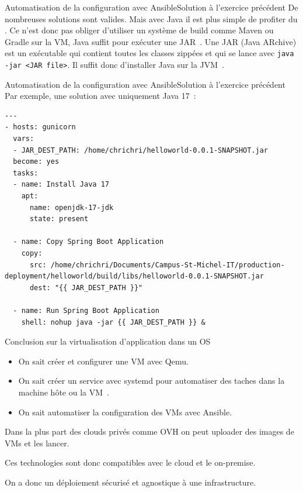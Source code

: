 \documentclass{beamer}
\begin{document}
    \begin{frame}{Automatisation de la configuration avec Ansible}{Solution à l'exercice précédent}
        De nombreuses solutions sont valides.
        Mais avec Java il est plus simple de profiter du .
        \bigbreak
        Ce n'est donc pas obliger d'utiliser un système de build comme Maven ou Gradle sur la VM, Java suffit pour exécuter une JAR~.
        \bigbreak
        Une JAR (Java ARchive) est un exécutable qui contient toutes les classes zippées et qui se lance avec \lstinline{java -jar <JAR file>}.
        Il suffit donc d'installer Java sur la JVM~.
    \end{frame}

    \begin{frame}[fragile]{Automatisation de la configuration avec Ansible}{Solution à l'exercice précédent}
        Par exemple, une solution avec uniquement Java 17~:
        \begin{lstlisting}[basicstyle=\ttfamily\tiny]
---
- hosts: gunicorn
  vars:
  - JAR_DEST_PATH: /home/chrichri/helloworld-0.0.1-SNAPSHOT.jar
  become: yes
  tasks:
  - name: Install Java 17
    apt:
      name: openjdk-17-jdk
      state: present

  - name: Copy Spring Boot Application
    copy:
      src: /home/chrichri/Documents/Campus-St-Michel-IT/production-deployment/helloworld/build/libs/helloworld-0.0.1-SNAPSHOT.jar
      dest: "{{ JAR_DEST_PATH }}"

  - name: Run Spring Boot Application
    shell: nohup java -jar {{ JAR_DEST_PATH }} &
        \end{lstlisting}
    \end{frame}


    \begin{frame}{Conclusion sur la virtualisation d'application dans un OS}
        \begin{itemize}
            \item On sait créer et configurer une VM avec Qemu.
            \item On sait créer un service avec systemd pour automatiser des taches dans la machine hôte ou la VM~.
            \item On sait automatiser la configuration des VMs avec Ansible.
        \end{itemize}
        \bigbreak
        Dans la plus part des clouds privés comme OVH on peut uploader des images de VMs et les lancer.

        Ces technologies sont donc compatibles avec le cloud et le on-premise.

        On a donc un déploiement sécurisé et agnostique à une infrastructure.
    \end{frame}
\end{document}
